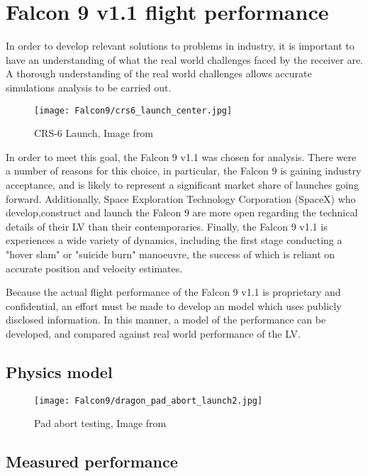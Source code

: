 \label{ch:Falcon9}
\chapter{Falcon 9 v1.1 flight performance}

In order to develop relevant solutions to  problems in industry, it is important to have an understanding of what the real world challenges faced by the receiver are. A thorough understanding of the real world challenges allows accurate simulations analysis to be carried out.

\begin{figure}[!htb] 
    \centering
    \texttt{[image: Falcon9/crs6\_launch\_center.jpg]} 
    \caption{CRS-6 Launch, Image from \cite{SpaceXPhotos}}
    \label{fig:Falcon9}
\end{figure}


In order to meet this goal, the Falcon 9 v1.1 was chosen for analysis. There were a number of reasons for this choice, in particular, the Falcon 9 is gaining industry acceptance, and is likely to represent a significant market share of launches going forward. Additionally, Space Exploration Technology Corporation (SpaceX) who develop,construct and launch the Falcon 9 are more open regarding the technical details of their \ac{LV} than their contemporaries. Finally, the Falcon 9 v1.1 is experiences a wide variety of dynamics, including the first stage conducting a "hover slam" or "suicide burn" manoeuvre, the success of which is reliant on accurate position and velocity estimates.

Because the actual flight performance of the Falcon 9 v1.1 is proprietary and confidential, an effort must be made to develop an model which uses publicly disclosed information. In this manner, a model of the performance can be developed, and compared against real world performance of the \ac{LV}.

\section{Physics model}

\begin{figure}[!htb] 
    \centering
    \texttt{[image: Falcon9/dragon\_pad\_abort\_launch2.jpg]} 
    \caption{Pad abort testing, Image from \cite{SpaceXPhotos}}
    \label{fig:PadAbort}
\end{figure}

\section{Measured performance}

